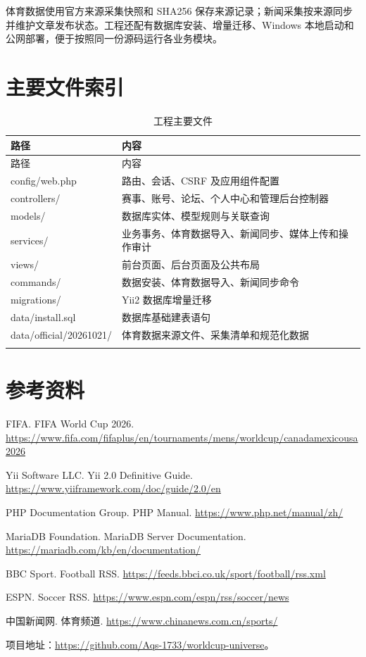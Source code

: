 \documentclass[UTF8,a4paper,11pt]{ctexart}
\begin{document}
体育数据使用官方来源采集快照和 SHA256 保存来源记录；新闻采集按来源同步并维护文章发布状态。工程还配有数据库安装、增量迁移、Windows 本地启动和公网部署，便于按照同一份源码运行各业务模块。

\section{主要文件索引}
\begin{longtable}{p{}p{}}\toprule 路径 & 内容\\\midrule\endfirsthead\toprule 路径 & 内容\\\midrule\endhead
config/web.php & 路由、会话、CSRF 及应用组件配置\\\midrule
controllers/ & 赛事、账号、论坛、个人中心和管理后台控制器\\\midrule
models/ & 数据库实体、模型规则与关联查询\\\midrule
services/ & 业务事务、体育数据导入、新闻同步、媒体上传和操作审计\\\midrule
views/ & 前台页面、后台页面及公共布局\\\midrule
commands/ & 数据安装、体育数据导入、新闻同步命令\\\midrule
migrations/ & Yii2 数据库增量迁移\\\midrule
data/install.sql & 数据库基础建表语句\\\midrule
data/official/20261021/ & 体育数据来源文件、采集清单和规范化数据\\\midrule
\bottomrule\caption{工程主要文件}\end{longtable}

\section{参考资料}
\begin{enumerate}[label={[\arabic*]},leftmargin=3em]
\item FIFA. FIFA World Cup 2026. \url{https://www.fifa.com/fifaplus/en/tournaments/mens/worldcup/canadamexicousa2026}
\item Yii Software LLC. Yii 2.0 Definitive Guide. \url{https://www.yiiframework.com/doc/guide/2.0/en}
\item PHP Documentation Group. PHP Manual. \url{https://www.php.net/manual/zh/}
\item MariaDB Foundation. MariaDB Server Documentation. \url{https://mariadb.com/kb/en/documentation/}
\item BBC Sport. Football RSS. \url{https://feeds.bbci.co.uk/sport/football/rss.xml}
\item ESPN. Soccer RSS. \url{https://www.espn.com/espn/rss/soccer/news}
\item 中国新闻网. 体育频道. \url{https://www.chinanews.com.cn/sports/}
\end{enumerate}
项目地址：\url{https://github.com/Aqs-1733/worldcup-universe}。
\end{document}
